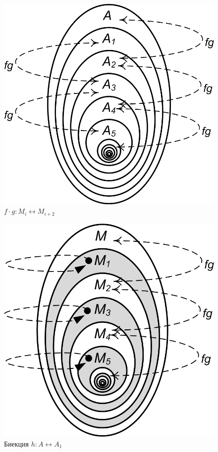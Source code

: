 \begin{figure}
    \centering
    \includegraphics{fig/kantorBernstein2}
    \caption{$f\cdot g:M_{i}\leftrightarrow M_{i+2}$}
    \label{fig:kantorBernstein2}
\end{figure} 

\begin{figure}
    \centering
    \includegraphics{fig/kantorBernstein3}
    \caption{Биекция $h:A\leftrightarrow A_1$}
    \label{fig:kantorBernstein3}
\end{figure} 

